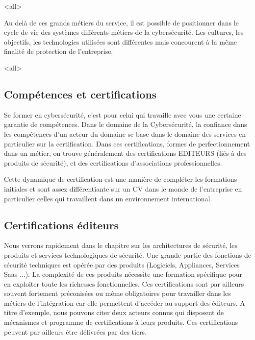 \mode<all>{}

Au delà de ces grands métiers du service, il est possible de positionner dans le cycle de vie des systèmes différents métiers de la cybersécurité. Les cultures, les objectifs, les technologies utilisées sont différentes mais concourent à la même finalité de protection de l'entreprise.

\mode<all>{}


\subsection{Compétences et certifications}

Se former en cybersécurité, c'est pour celui qui travaille avec vous une certaine garantie de compétences. Dans le domaine de la Cybersécurité, la confiance dans les compétences d'un acteur du domaine se base dans le domaine des services en particulier sur la certification. Dans ces certifications, formes de perfectionnement dans un métier, on trouve généralement des  certifications EDITEURS (liés à des produits de sécurité), et des certifications d'associations professionnelles. 

Cette dynamique de certification est une manière de compléter les formations initiales et sont  assez différentiante sur un CV dans le monde de l'entreprise en particulier celles qui travaillent dans un environnement international.


\subsection{Certifications éditeurs}

Nous verrons rapidement dans le chapitre sur les architectures de sécurité, les produits et services technologiques de sécurité. Une grande partie des fonctions de sécurité techniques est opérée par des produits (Logiciels, Appliances, Services Saas ...). La complexité de ces produits nécessite une formation spécifique pour en exploiter toute les richesses fonctionnelles.
Ces certifications sont par ailleurs souvent fortement préconisées ou même obligatoires pour travailler dans les métiers de l'intégration car elle permettent d'accéder au support des éditeurs. A titre d'exemple, nous pouvons citer deux acteurs connus qui disposent de mécanismes et programme de certifications à leurs produits. Ces certifications peuvent par ailleurs être délivrées par des tiers.


